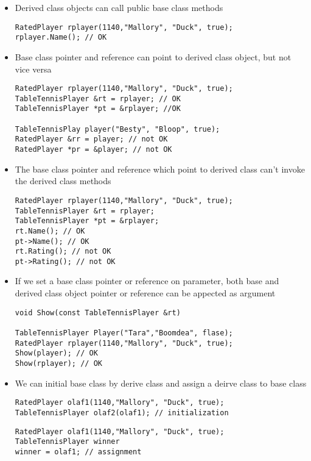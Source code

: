 \documentclass[10pt,a4paper,oneside]{article}
\begin{document}
\begin{itemize}
\item Derived class objects can call public base class methods
 \begin{lstlisting}
RatedPlayer rplayer(1140,"Mallory", "Duck", true);
rplayer.Name(); // OK
\end{lstlisting}
\item Base class pointer and reference can point to derived class object, but not vice versa
\begin{lstlisting}
RatedPlayer rplayer(1140,"Mallory", "Duck", true);
TableTennisPlayer &rt = rplayer; // OK
TableTennisPlayer *pt = &rplayer; //OK

TableTennisPlay player("Besty", "Bloop", true);
RatedPlayer &rr = player; // not OK
RatedPlayer *pr = &player; // not OK
\end{lstlisting}
\item The base class pointer and reference which point to derived class can't invoke the derived class methods
\begin{lstlisting}
RatedPlayer rplayer(1140,"Mallory", "Duck", true);
TableTennisPlayer &rt = rplayer;
TableTennisPlayer *pt = &rplayer;
rt.Name(); // OK
pt->Name(); // OK
rt.Rating(); // not OK
pt->Rating(); // not OK
\end{lstlisting}
\item If we set a base class pointer or reference on parameter, both base and derived class object pointer or reference can be appected as argument
\begin{lstlisting}
void Show(const TableTennisPlayer &rt)

TableTennisPlayer Player("Tara","Boomdea", flase);
RatedPlayer rplayer(1140,"Mallory", "Duck", true);
Show(player); // OK
Show(rplayer); // OK
\end{lstlisting}
\item We can initial base class by derive class and assign a deirve class to base class
\begin{lstlisting}
RatedPlayer olaf1(1140,"Mallory", "Duck", true);
TableTennisPlayer olaf2(olaf1); // initialization
\end{lstlisting}
\begin{lstlisting}
RatedPlayer olaf1(1140,"Mallory", "Duck", true);
TableTennisPlayer winner
winner = olaf1; // assignment
\end{lstlisting}
\end{itemize}
\end{document}
